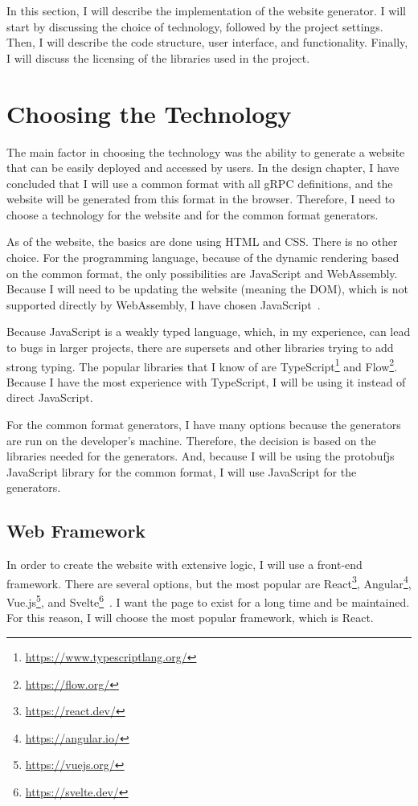In this section, I will describe the implementation of the website generator.
I will start by discussing the choice of technology, followed by the project settings.
Then, I will describe the code structure, user interface, and functionality.
Finally, I will discuss the licensing of the libraries used in the project.


\section{Choosing the Technology}
The main factor in choosing the technology was the ability to generate a website that can be easily deployed and accessed by users.
In the design chapter, I have concluded that I will use a common format with all gRPC definitions, and the website will be generated from this format in the browser.
Therefore, I need to choose a technology for the website and for the common format generators.

As of the website, the basics are done using HTML and CSS\@.
There is no other choice.
For the programming language, because of the dynamic rendering based on the common format, the only possibilities are JavaScript and WebAssembly.
Because I will need to be updating the website (meaning the DOM), which is not supported directly by WebAssembly, I have chosen JavaScript~\cite{webassembly-dom}.

Because JavaScript is a weakly typed language, which, in my experience, can lead to bugs in larger projects, there are supersets and other libraries trying to add strong typing.
The popular libraries that I know of are TypeScript\footnote{\url{https://www.typescriptlang.org/}} and Flow\footnote{\url{https://flow.org/}}.
Because I have the most experience with TypeScript, I will be using it instead of direct JavaScript.

For the common format generators, I have many options because the generators are run on the developer's machine.
Therefore, the decision is based on the libraries needed for the generators.
And, because I will be using the protobufjs JavaScript library for the common format, I will use JavaScript for the generators.

\subsection{Web Framework}
In order to create the website with extensive logic, I will use a front-end framework.
There are several options, but the most popular are React\footnote{\url{https://react.dev/}}, Angular\footnote{\url{https://angular.io/}}, Vue.js\footnote{\url{https://vuejs.org/}}, and Svelte\footnote{\url{https://svelte.dev/}}~\cite{state-of-js-frontend-frameworks}.
I want the page to exist for a long time and be maintained.
For this reason, I will choose the most popular framework, which is React.

